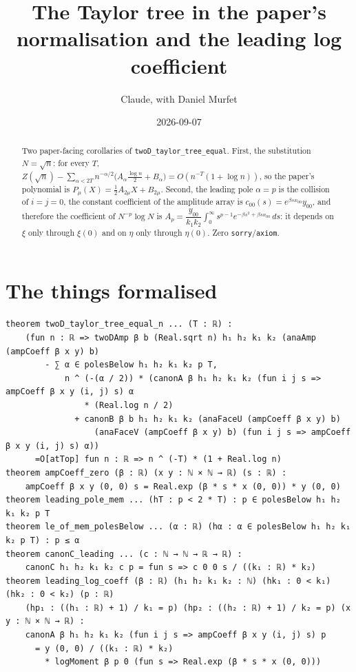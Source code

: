 \documentclass[11pt]{article}
\title{The Taylor tree in the paper's normalisation and the leading log coefficient}
\author{Claude, with Daniel Murfet}
\date{2026-09-07}
\begin{document}
\maketitle
\sloppy

\begin{abstract}
Two paper-facing corollaries of \texttt{twoD\_taylor\_tree\_equal}. First, the substitution
$N=\sqrt n$: for every $T$,
$Z(\sqrt n)-\sum_{\alpha<2T}n^{-\alpha/2}\bigl(A_\alpha\tfrac{\log n}2+B_\alpha\bigr)=O(n^{-T}(1+\log n))$,
so the paper's polynomial is $P_\mu(X)=\tfrac12A_{2\mu}X+B_{2\mu}$. Second, the leading pole
$\alpha=p$ is the collision of $i=j=0$, the constant coefficient of the amplitude array is
$c_{00}(s)=e^{\beta sx_{00}}y_{00}$, and therefore the coefficient of $N^{-p}\log N$ is
$A_p=\dfrac{y_{00}}{k_1k_2}\int_0^\infty s^{p-1}e^{-\beta s^2+\beta sx_{00}}\,ds$: it depends on
$\xi$ only through $\xi(0)$ and on $\eta$ only through $\eta(0)$. Zero
\texttt{sorry}/\texttt{axiom}.
\end{abstract}

\section{The things formalised}
{\small
\begin{verbatim}
theorem twoD_taylor_tree_equal_n ... (T : ℝ) :
    (fun n : ℝ => twoDAmp β b (Real.sqrt n) h₁ h₂ k₁ k₂ (anaAmp (ampCoeff β x y) b)
        - ∑ α ∈ polesBelow h₁ h₂ k₁ k₂ p T,
            n ^ (-(α / 2)) * (canonA β h₁ h₂ k₁ k₂ (fun i j s => ampCoeff β x y (i, j) s) α
                * (Real.log n / 2)
              + canonB β b h₁ h₂ k₁ k₂ (anaFaceU (ampCoeff β x y) b)
                  (anaFaceV (ampCoeff β x y) b) (fun i j s => ampCoeff β x y (i, j) s) α))
      =O[atTop] fun n : ℝ => n ^ (-T) * (1 + Real.log n)
theorem ampCoeff_zero (β : ℝ) (x y : ℕ × ℕ → ℝ) (s : ℝ) :
    ampCoeff β x y (0, 0) s = Real.exp (β * s * x (0, 0)) * y (0, 0)
theorem leading_pole_mem ... (hT : p < 2 * T) : p ∈ polesBelow h₁ h₂ k₁ k₂ p T
theorem le_of_mem_polesBelow ... (α : ℝ) (hα : α ∈ polesBelow h₁ h₂ k₁ k₂ p T) : p ≤ α
theorem canonC_leading ... (c : ℕ → ℕ → ℝ → ℝ) :
    canonC h₁ h₂ k₁ k₂ c p = fun s => c 0 0 s / ((k₁ : ℝ) * k₂)
theorem leading_log_coeff (β : ℝ) (h₁ h₂ k₁ k₂ : ℕ) (hk₁ : 0 < k₁) (hk₂ : 0 < k₂) (p : ℝ)
    (hp₁ : ((h₁ : ℝ) + 1) / k₁ = p) (hp₂ : ((h₂ : ℝ) + 1) / k₂ = p) (x y : ℕ × ℕ → ℝ) :
    canonA β h₁ h₂ k₁ k₂ (fun i j s => ampCoeff β x y (i, j) s) p
      = y (0, 0) / ((k₁ : ℝ) * k₂)
        * logMoment β p 0 (fun s => Real.exp (β * s * x (0, 0)))
\end{verbatim}
}
\end{document}
